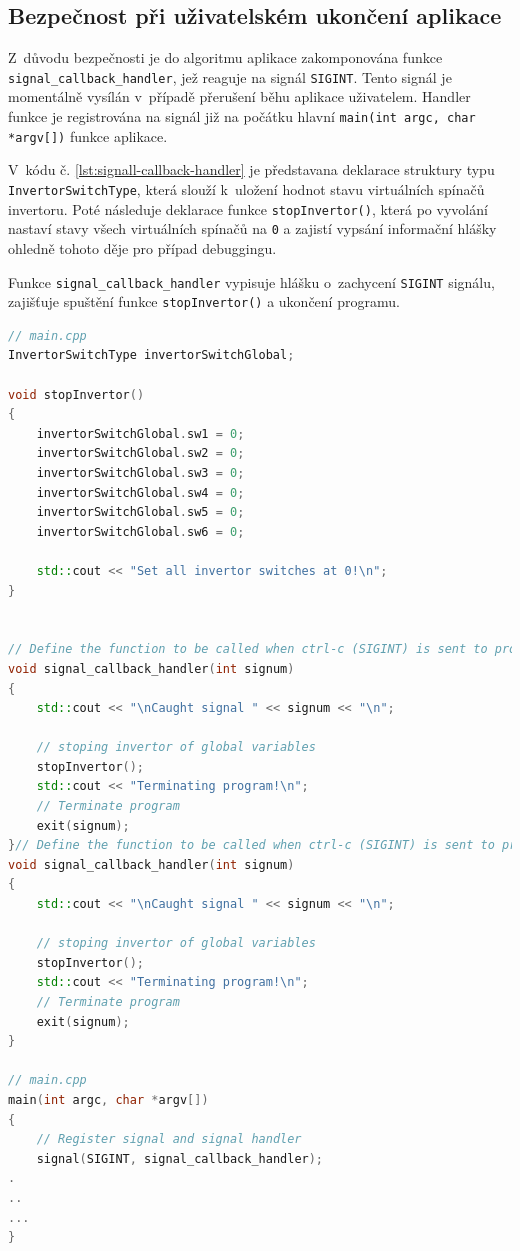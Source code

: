 \documentclass[a4paper, twoside, 11pt]{article}
\begin{document}
	\subsection{Bezpečnost při uživatelském ukončení aplikace}
	Z~důvodu bezpečnosti je do algoritmu aplikace zakomponována funkce \texttt{signal\_callback\_handler}, jež reaguje na signál \texttt{SIGINT}. Tento signál je momentálně vysílán v~případě přerušení běhu aplikace uživatelem. Handler funkce je registrována na signál již na počátku hlavní \texttt{main(int argc, char *argv[])} funkce aplikace.\par
	V~kódu č. \ref{lst:signall-callback-handler} je představana deklarace struktury typu \texttt{InvertorSwitchType}, která slouží k~uložení hodnot stavu virtuálních spínačů invertoru. Poté následuje deklarace funkce \texttt{stopInvertor()}, která po vyvolání nastaví stavy všech virtuálních spínačů na \texttt{0} a zajistí vypsání informační hlášky ohledně tohoto děje pro případ debuggingu.\par
	Funkce \texttt{signal\_callback\_handler} vypisuje hlášku o~zachycení \texttt{SIGINT} signálu, zajišťuje spuštění funkce \texttt{stopInvertor()} a ukončení programu.

	\begin{lstlisting}[language={c++}, caption={signal\_callback\_handler funkce a její registrace na signál SIGINT.}, label={lst:signall-callback-handler}]
// main.cpp
InvertorSwitchType invertorSwitchGlobal;

void stopInvertor()
{
    invertorSwitchGlobal.sw1 = 0;
    invertorSwitchGlobal.sw2 = 0;
    invertorSwitchGlobal.sw3 = 0;
    invertorSwitchGlobal.sw4 = 0;
    invertorSwitchGlobal.sw5 = 0;
    invertorSwitchGlobal.sw6 = 0;

    std::cout << "Set all invertor switches at 0!\n";
}


// Define the function to be called when ctrl-c (SIGINT) is sent to process
void signal_callback_handler(int signum)
{
    std::cout << "\nCaught signal " << signum << "\n";

    // stoping invertor of global variables
    stopInvertor();
    std::cout << "Terminating program!\n";
    // Terminate program
    exit(signum);
}// Define the function to be called when ctrl-c (SIGINT) is sent to process
void signal_callback_handler(int signum)
{
    std::cout << "\nCaught signal " << signum << "\n";

    // stoping invertor of global variables
    stopInvertor();
    std::cout << "Terminating program!\n";
    // Terminate program
    exit(signum);
}

// main.cpp
main(int argc, char *argv[])
{
	// Register signal and signal handler
	signal(SIGINT, signal_callback_handler);
.
..
...
}\end{lstlisting}
\end{document}
